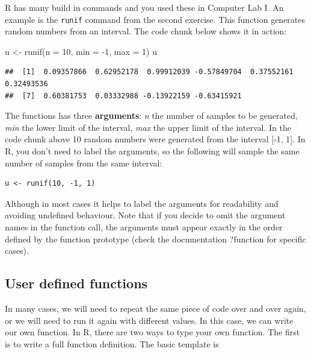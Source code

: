 \documentclass[
]{book}
\newenvironment{Shaded}{\begin{snugshade}}{\end{snugshade}}
\newcommand{\AttributeTok}[1]{\textcolor[rgb]{0.77,0.63,0.00}{#1}}
\newcommand{\DecValTok}[1]{\textcolor[rgb]{0.00,0.00,0.81}{#1}}
\newcommand{\FunctionTok}[1]{\textcolor[rgb]{0.00,0.00,0.00}{#1}}
\newcommand{\NormalTok}[1]{#1}
\newcommand{\OtherTok}[1]{\textcolor[rgb]{0.56,0.35,0.01}{#1}}
\newcommand{\SpecialCharTok}[1]{\textcolor[rgb]{0.00,0.00,0.00}{#1}}
\theoremstyle{definition}
\theoremstyle{definition}
\theoremstyle{definition}
\theoremstyle{definition}
\theoremstyle{remark}
\begin{document}
R has many build in commands and you used these in Computer Lab I. An example is the \texttt{runif} command from the second exercise. This function generates random numbers from an interval. The code chunk below shows it in action:

\begin{Shaded}
\begin{Highlighting}[]
\NormalTok{u }\OtherTok{\textless{}{-}} \FunctionTok{runif}\NormalTok{(}\AttributeTok{n =} \DecValTok{10}\NormalTok{, }\AttributeTok{min =} \SpecialCharTok{{-}}\DecValTok{1}\NormalTok{, }\AttributeTok{max =} \DecValTok{1}\NormalTok{)}
\NormalTok{u}
\end{Highlighting}
\end{Shaded}

\begin{verbatim}
##  [1]  0.09357866  0.62952178  0.99912039 -0.57849704  0.37552161  0.32493536
##  [7]  0.60381753  0.03332988 -0.13922159 -0.63415921
\end{verbatim}

The functions has three \textbf{arguments}: \emph{n} the number of samples to be generated, \emph{min} the lower limit of the interval, \emph{max} the upper limit of the interval. In the code chunk above 10 random numbers were generated from the interval {[}-1, 1{]}. In R, you don't need to label the arguments, so the following will sample the same number of samples from the same interval:

\begin{verbatim}
u <- runif(10, -1, 1)
\end{verbatim}

Although in most cases it helps to label the arguments for readability and avoiding undefined behaviour. Note that if you decide to omit the argument names in the function call, the arguments must appear exactly in the order defined by the function prototype (check the documentation ?function for specific cases).

\hypertarget{user-defined-functions}{%
\subsection{User defined functions}\label{user-defined-functions}}

In many cases, we will need to repeat the same piece of code over and over again, or we will need to run it again with different values. In this case, we can write our own function. In R, there are two ways to type your own function. The first is to write a full function definition. The basic template is
\end{document}
